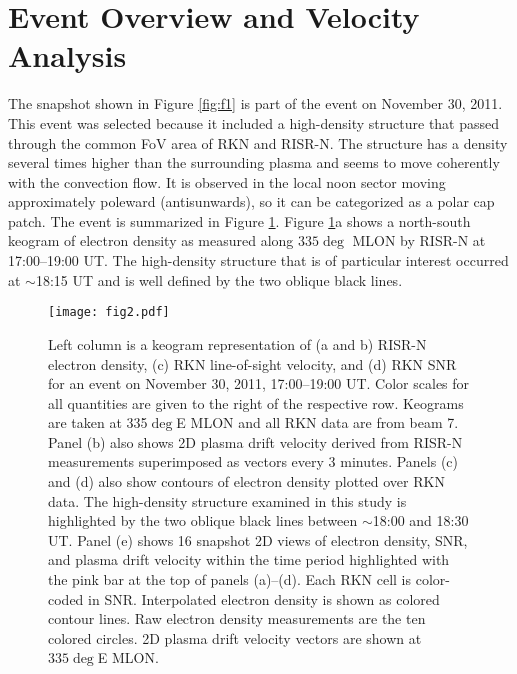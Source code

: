 \section{Event Overview and Velocity Analysis}
The snapshot shown in Figure \ref{fig:f1} is part of the event on November 30, 2011.  This event was selected because it included a high-density structure that passed through the common FoV area of RKN and RISR-N.  The structure has a density several times higher than the surrounding plasma and seems to move coherently with the convection flow.  It is observed in the local noon sector moving approximately poleward (antisunwards), so it can be categorized as a polar cap patch. The event is summarized in Figure \ref{fig:f2}.  Figure \ref{fig:f2}a shows a north-south keogram of electron density as measured along \(335\deg\) MLON by RISR-N at 17:00--19:00 UT.  The high-density structure that is of particular interest occurred at \(\sim\)18:15 UT and is well defined by the two oblique black lines.

\begin{figure}
	\texttt{[image: fig2.pdf]}
  \caption{Left column is a keogram representation of (a and b) RISR-N electron density, (c) RKN line-of-sight velocity, and (d) RKN SNR for an event on November 30, 2011, 17:00--19:00 UT.  Color scales for all quantities are given to the right of the respective row. Keograms are taken at 335\(\deg\)E MLON and all RKN data are from beam 7.  Panel (b) also shows 2D plasma drift velocity derived from RISR-N measurements superimposed as vectors every 3 minutes.  Panels (c) and (d) also show contours of electron density plotted over RKN data. The high-density structure examined in this study is highlighted by the two oblique black lines between \(\sim\)18:00 and 18:30 UT. Panel (e) shows 16 snapshot 2D views of electron density, SNR, and plasma drift velocity within the time period highlighted with the pink bar at the top of panels (a)--(d).  Each RKN cell is color-coded in SNR. Interpolated electron density is shown as colored contour lines. Raw electron density measurements are the ten colored circles.  2D plasma drift velocity vectors are shown at \(335\deg\)E MLON.}
  \label{fig:f2}
\end{figure}

